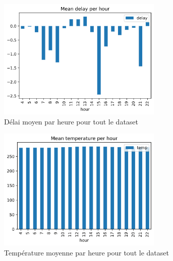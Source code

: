 \documentclass[12pt]{report}
\begin{document}
\begin{appendices}
    \begin{figure}[h]
        \centering
        \includegraphics[width=0.7\textwidth]{images/mean_delay_per_hour.png}
        \caption{Délai moyen par heure pour tout le dataset}
        \label{appendix:mean_delay_per_hour}
    \end{figure}

    \begin{figure}[h]
        \centering
        \includegraphics[width=0.7\textwidth]{images/mean_temp_per_hour.png}
        \caption{Température moyenne par heure pour tout le dataset}
        \label{appendix:mean_temp_per_hour}
    \end{figure}

\end{appendices}

\lstlistoflistings

\nocite{*}
\printbibliography
\end{document}
